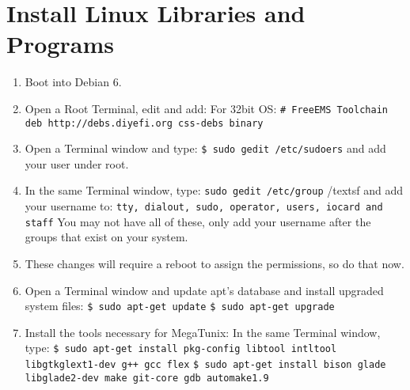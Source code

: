 \documentclass[12pt,notitlepage,onecolumn,oneside,openany]{memoir}
\begin{document}
\chapter{\textsf{Install Linux Libraries and Programs}}

\begin{enumerate}
\item \textsf{Boot into Debian 6.}
\item \textsf{Open a Root Terminal, edit  and add:} \newline
	\textsf{For 32bit OS:} \newline
\texttt{\# FreeEMS Toolchain} \newline
\texttt{deb http://debs.diyefi.org css-debs binary}

\item \textsf{Open a Terminal window and type:} \newline
      \texttt{\$ sudo gedit /etc/sudoers} \newline
      \textsf{and add your user under root.}

\item \textsf{In the same Terminal window, type:} \newline
      \texttt{sudo gedit /etc/group} /textsf{ and add your username to:} \newline
      \texttt{tty, dialout, sudo, operator, users, iocard and staff} \newline
      \textsf{You may not have all of these, only add your username after the groups that exist on your system.}

\item \textsf{These changes will require a reboot to assign the permissions, so do that now.}

\item \textsf{Open a Terminal window and update apt's database and install upgraded system files:} \newline
      \texttt{\$ sudo apt-get update} \newline
      \texttt{\$ sudo apt-get upgrade}

\item \textsf{Install the tools necessary for MegaTunix:} \newline
      \textsf{In the same Terminal window, type:} \newline
      \texttt{\$ sudo apt-get install pkg-config libtool intltool libgtkglext1-dev g++ gcc flex} \newline
      \texttt{\$ sudo apt-get install bison glade libglade2-dev make git-core gdb automake1.9}


\end{enumerate}
\end{document}

